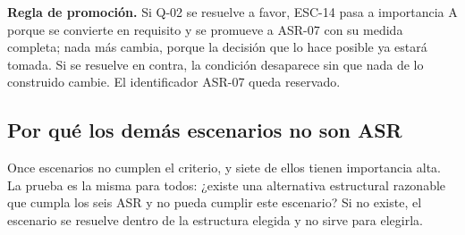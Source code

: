 \textbf{Regla de promoción.} Si Q-02 se resuelve a favor, ESC-14 pasa a importancia A porque se convierte en requisito y se promueve a ASR-07 con su medida completa; nada más cambia, porque la decisión que lo hace posible ya estará tomada. Si se resuelve en contra, la condición desaparece sin que nada de lo construido cambie. El identificador ASR-07 queda reservado.

\subsection{Por qué los demás escenarios no son ASR}\label{sec:asr:noasr}

Once escenarios no cumplen el criterio, y siete de ellos tienen importancia alta. La prueba es la misma para todos: ¿existe una alternativa estructural razonable que cumpla los seis ASR y no pueda cumplir este escenario? Si no existe, el escenario se resuelve dentro de la estructura elegida y no sirve para elegirla.

